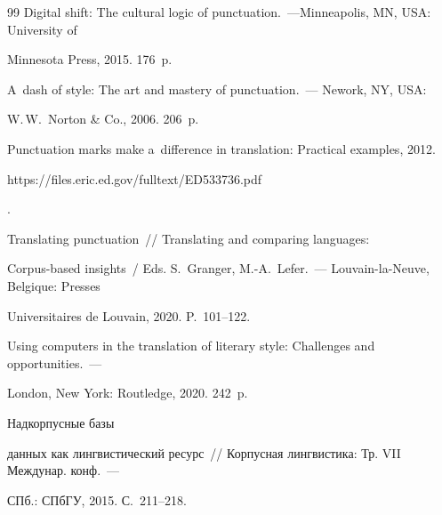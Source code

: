 {{\begin{thebibliography}{99}
 Digital shift: The cultural logic of punctuation.~---Minneapolis, MN, USA: University of 


Minnesota Press, 2015. 176~p.




 A~dash of style: The art and mastery of punctuation.~--- Nework, NY, USA: 


W.\,W.~Norton \& Co., 2006. 206~p.




 Punctuation marks make a~difference in translation: Practical examples, 2012. {\sf 


https://files.eric.ed.gov/fulltext/ED533736.pdf}.




 Translating punctuation~/\!\!/ Translating and comparing languages: 


Corpus-based insights~/ Eds. S.~Granger, M.-A.~Lefer.~--- Louvain-la-Neuve, Belgique: Presses 


Universitaires de Louvain, 2020. P.~101--122.










 Using computers in the translation of literary style: Challenges and opportunities.~--- 


London, New York: Routledge, 2020. 242~p.




 Надкорпусные базы 


данных как лингвистический ресурс~/\!\!/ Корпусная лингвистика: Тр. VII Междунар. конф.~--- 


СПб.: СПбГУ, 2015. С.~211--218.





 \end{thebibliography}


} }











\vspace*{-3pt}





